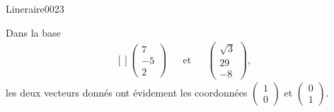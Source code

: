 \begin{corrige}{Lineraire0023}

	Dans la base
	\begin{equation}
		\begin{aligned}[]
			\begin{pmatrix}
				7	\\ 
				-5	\\ 
				2	
			\end{pmatrix}&&\text{et}&&\begin{pmatrix}
				\sqrt{3}	\\ 
				29	\\ 
				-8	
			\end{pmatrix},
		\end{aligned}
	\end{equation}
	les deux vecteurs donnés ont évidement les coordonnées $\begin{pmatrix}
		1	\\ 
		0	
	\end{pmatrix}$ et $\begin{pmatrix}
		0	\\ 
		1	
	\end{pmatrix}$.

\end{corrige}
